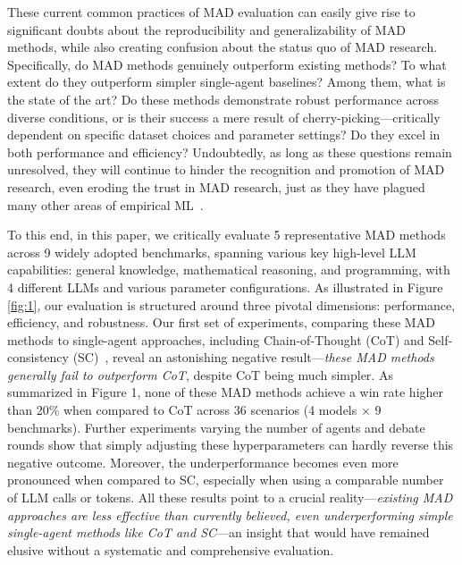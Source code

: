 

These current common practices of MAD evaluation can easily give rise to significant doubts about the reproducibility and generalizability of MAD methods, while also creating confusion about the status quo of MAD research. Specifically, do MAD methods genuinely outperform existing methods? To what extent do they outperform simpler single-agent baselines? Among them, what is the state of the art? Do these methods demonstrate robust performance across diverse conditions, or is their success a mere result of cherry-picking---critically dependent on specific dataset choices and parameter settings? Do they excel in both performance and efficiency?
Undoubtedly, as long as these questions remain unresolved, they will continue to hinder the recognition and promotion of MAD research, even eroding the trust in MAD research, just as they have plagued many other areas of empirical ML~\citep{herrmann2024position}.


To this end, in this paper, we critically evaluate 5 representative MAD methods across 9 widely adopted benchmarks, spanning various key high-level LLM capabilities: general knowledge, mathematical reasoning, and programming, with 4 different LLMs and various parameter configurations. As illustrated in Figure \ref{fig:1}, our evaluation is structured around three pivotal dimensions: performance, efficiency, and robustness.
Our first set of experiments, comparing these MAD methods to single-agent approaches, including Chain-of-Thought (CoT) and Self-consistency (SC)~\citep{wang2022self}, reveal an astonishing negative result---\emph{these MAD methods generally fail to outperform CoT}, despite CoT being much simpler.
As summarized in Figure 1, none of these MAD methods achieve a win rate higher than 20\% when compared to CoT across 36 scenarios (4 models $\times$ 9 benchmarks).
Further experiments varying the number of agents and debate rounds show that simply adjusting these hyperparameters can hardly reverse this negative outcome.
Moreover, the underperformance becomes even more pronounced when compared to SC, especially when using a comparable number of LLM calls or tokens.
All these results point to a crucial reality---\emph{existing MAD approaches are less effective than currently believed, even underperforming simple single-agent methods like CoT and SC}---an insight that would have remained elusive without a systematic and comprehensive evaluation.

